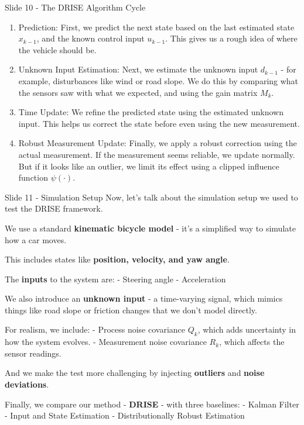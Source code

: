 \documentclass{beamer}
\begin{document}
\begin{frame}{Slide 10 - The DRISE Algorithm Cycle}
\protect\hypertarget{slide-10---the-drise-algorithm-cycle}{}
\begin{enumerate}
\tightlist
\item
  Prediction: First, we predict the next state based on the last
  estimated state \(x_{k-1}\), and the known control input \(u_{k-1}\).
  This gives us a rough idea of where the vehicle should be.
\item
  Unknown Input Estimation: Next, we estimate the unknown input
  \(d_{k-1}\) - for example, disturbances like wind or road slope. We do
  this by comparing what the sensors saw with what we expected, and
  using the gain matrix \(M_k\).
\item
  Time Update: We refine the predicted state using the estimated unknown
  input. This helps us correct the state before even using the new
  measurement.
\item
  Robust Measurement Update: Finally, we apply a robust correction using
  the actual measurement. If the measurement seems reliable, we update
  normally. But if it looks like an outlier, we limit its effect using a
  clipped influence function \(\psi(\cdot)\).
\end{enumerate}
\end{frame}

\begin{frame}{Slide 11 - Simulation Setup}
\protect\hypertarget{slide-11---simulation-setup}{}
Now, let's talk about the simulation setup we used to test the DRISE
framework.

We use a standard \textbf{kinematic bicycle model} - it's a simplified
way to simulate how a car moves.

This includes states like \textbf{position, velocity, and yaw angle}.

The \textbf{inputs} to the system are: - Steering angle - Acceleration

We also introduce an \textbf{unknown input} - a time-varying signal,
which mimics things like road slope or friction changes that we don't
model directly.

For realism, we include: - Process noise covariance \(Q_k\), which adds
uncertainty in how the system evolves. - Measurement noise covariance
\(R_k\), which affects the sensor readings.

And we make the test more challenging by injecting \textbf{outliers} and
\textbf{noise deviations}.

Finally, we compare our method - \textbf{DRISE} - with three baselines:
- Kalman Filter - Input and State Estimation - Distributionally Robust
Estimation
\end{frame}
\end{document}
